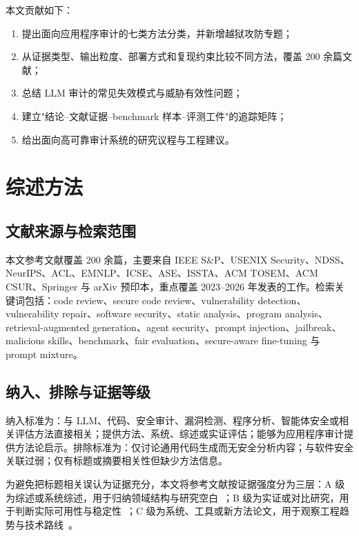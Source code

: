 \documentclass[11pt,a4paper,onecolumn]{article}
\begin{document}
本文贡献如下：
\begin{enumerate}[leftmargin=*]
  \item 提出面向应用程序审计的七类方法分类，并新增越狱攻防专题；
  \item 从证据类型、输出粒度、部署方式和复现约束比较不同方法，覆盖 200 余篇文献；
  \item 总结 LLM 审计的常见失效模式与威胁有效性问题；
  \item 建立"结论--文献证据--benchmark 样本--评测工件"的追踪矩阵；
  \item 给出面向高可靠审计系统的研究议程与工程建议。
\end{enumerate}

\section{综述方法}

\subsection{文献来源与检索范围}
本文参考文献覆盖 200 余篇，主要来自 IEEE S\&P、USENIX Security、NDSS、NeurIPS、ACL、EMNLP、ICSE、ASE、ISSTA、ACM TOSEM、ACM CSUR、Springer 与 arXiv 预印本，重点覆盖 2023--2026 年发表的工作。检索关键词包括：code review、secure code review、vulnerability detection、vulnerability repair、software security、static analysis、program analysis、retrieval-augmented generation、agent security、prompt injection、jailbreak、malicious skills、benchmark、fair evaluation、secure-aware fine-tuning 与 prompt mixture。

\subsection{纳入、排除与证据等级}
纳入标准为：与 LLM、代码、安全审计、漏洞检测、程序分析、智能体安全或相关评估方法直接相关；提供方法、系统、综述或实证评估；能够为应用程序审计提供方法论启示。排除标准为：仅讨论通用代码生成而无安全分析内容；与软件安全关联过弱；仅有标题或摘要相关性但缺少方法信息。

为避免把标题相关误认为证据充分，本文将参考文献按证据强度分为三层：A 级为综述或系统综述，用于归纳领域结构与研究空白~\cite{sheng2026llmsecurity,chen2026lmcode,kaniewski2026detecting,zhou2025vulndetrepair,sheng2025cybersecurity_slr,davila_nunes_2021_slr_taxonomy,code_security_slr_2024,lm_code_security_slr_2024,llm_security_survey_2025,slr_vuln_llm_2025}；B 级为实证或对比研究，用于判断实际可用性与稳定性~\cite{ullaha_vuln_reasoning_2024,paquette2024llmscannot,risse2024limits,niu2025largetomammoth,charoenwet_2024_sast_secure_review}；C 级为系统、工具或新方法论文，用于观察工程趋势与技术路线~\cite{llmxcpg_2025,mirsky2023vulchecker,fu2021linevul,debenedetti2024agentdojo}。
\end{document}
